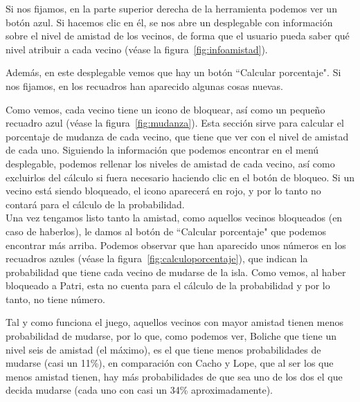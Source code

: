 Si nos fijamos, en la parte superior derecha de la herramienta podemos ver un botón azul. Si hacemos clic en él, se nos abre un desplegable con información sobre el nivel de amistad de los vecinos, de forma que el usuario pueda saber qué nivel atribuir a cada vecino {(v\'ease la figura~\ref{fig:infoamistad})}.\\


\clearpage

Además, en este desplegable vemos que hay un botón ``Calcular porcentaje". Si nos fijamos, en los recuadros han aparecido algunas cosas nuevas.\\


Como vemos, cada vecino tiene un icono de bloquear, así como un pequeño recuadro azul {(v\'ease la figura~\ref{fig:mudanza})}. Esta sección sirve para calcular el porcentaje de mudanza de cada vecino, que tiene que ver con el nivel de amistad de cada uno. Siguiendo la información que podemos encontrar en el menú desplegable, podemos rellenar los niveles de amistad de cada vecino, así como excluirlos del cálculo si fuera necesario haciendo clic en el botón de bloqueo. Si un vecino está siendo bloqueado, el icono aparecerá en rojo, y por lo tanto no contará para el cálculo de la probabilidad.\\

Una vez tengamos listo tanto la amistad, como aquellos vecinos bloqueados (en caso de haberlos), le damos al botón de ``Calcular porcentaje" que podemos encontrar más arriba. Podemos observar que han aparecido unos números en los recuadros azules {(v\'ease la figura~\ref{fig:calculoporcentaje})}, que indican la probabilidad que tiene cada vecino de mudarse de la isla. Como vemos, al haber bloqueado a Patri, esta no cuenta para el cálculo de la probabilidad y por lo tanto, no tiene número.\\


Tal y como funciona el juego, aquellos vecinos con mayor amistad tienen menos probabilidad de mudarse, por lo que, como podemos ver, Boliche que tiene un nivel seis de amistad (el máximo), es el que tiene menos probabilidades de mudarse (casi un 11\%), en comparación con Cacho y Lope, que al ser los que menos amistad tienen, hay más probabilidades de que sea uno de los dos el que decida mudarse (cada uno con casi un 34\% aproximadamente).\\

